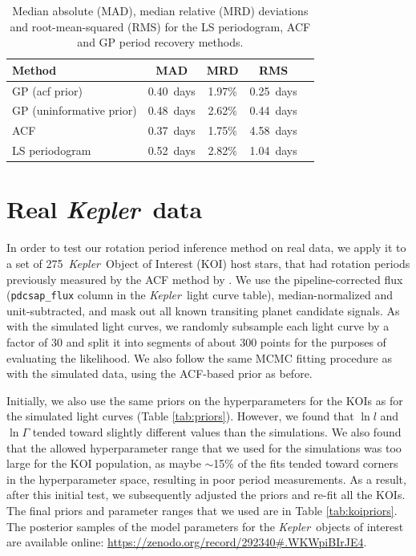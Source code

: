 \documentclass[a4paper,fleqn,usenatbib,useAMS]{mnras}
\newcommand{\Kepler}{{\it Kepler}}
\newcommand{\kepler}{\Kepler}
\newcommand{\nkoimcq}{275}
\newcommand{\pgramRMS}{1.04}
\newcommand{\pgramMAD}{0.52}
\newcommand{\percentpgramMAD}{2.82}
\newcommand{\gpRMS}{0.25}
\newcommand{\gpMAD}{0.40}
\newcommand{\percentgpMAD}{1.97}
\newcommand{\gpRMSnp}{0.44}
\newcommand{\gpMADnp}{0.48}
\newcommand{\percentgpMADnp}{2.62}
\newcommand{\telavivRMS}{4.58}
\newcommand{\telavivMAD}{0.37}
\newcommand{\percenttelavivMAD}{1.75}
\begin{document}
\begin{table}
\begin{center}
    \caption{\label{tab:MADs} Median absolute (MAD), median relative (MRD)
    deviations and root-mean-squared (RMS) for the LS periodogram,
    \citet{Mcquillan2013} ACF and GP period recovery methods.}
\begin{tabular}{lcccc}
    Method & MAD & MRD & RMS \\
    \hline
    GP (acf prior) & \gpMAD\ days & \percentgpMAD \% & \gpRMS\ days \\
    GP (uninformative prior) & \gpMADnp\ days & \percentgpMADnp \% &
    \gpRMSnp\ days \\
    ACF & \telavivMAD\ days & \percenttelavivMAD \%
    & \telavivRMS\ days \\
    LS periodogram & \pgramMAD\ days & \percentpgramMAD \% & \pgramRMS\ days\\
\end{tabular}
\end{center}
\end{table}

\section{Real \kepler\ data}
\label{sec:kepler}

In order to test our rotation period inference method on real data,
we apply it to a set of \nkoimcq\ \Kepler\ Object of Interest (KOI)
host stars, that had rotation periods previously measured by
the ACF method by \citet{Mcquillan2013}.
We use the pipeline-corrected flux (\texttt{pdcsap\_flux} column in the
\Kepler\ light curve table), median-normalized and unit-subtracted, and mask
out all known transiting planet candidate signals.
As with the simulated light curves, we randomly subsample each
light curve by a factor of 30 and split it into segments of about 300 points
for the purposes of evaluating the likelihood.
We also follow the same MCMC fitting procedure as with the simulated data,
using the ACF-based prior as before.

Initially, we also use the same priors on the hyperparameters for the KOIs
as for the simulated light curves (Table \ref{tab:priors}).
However, we found that $\ln l$ and $\ln \Gamma$ tended toward slightly
different values than the simulations.
We also found that the allowed hyperparameter range that we used for the
simulations was too large for the KOI population, as maybe $\sim$15\% of the
fits tended toward corners in the hyperparameter space, resulting in poor
period measurements.
As a result, after this initial test, we subsequently adjusted the priors and
re-fit all the KOIs.
The final priors and parameter ranges that we used are in Table
\ref{tab:koipriors}.
The posterior samples of the model parameters for the \Kepler\ objects of
interest are available online:
\url{https://zenodo.org/record/292340\#.WKWpiBIrJE4}.
\end{document}
